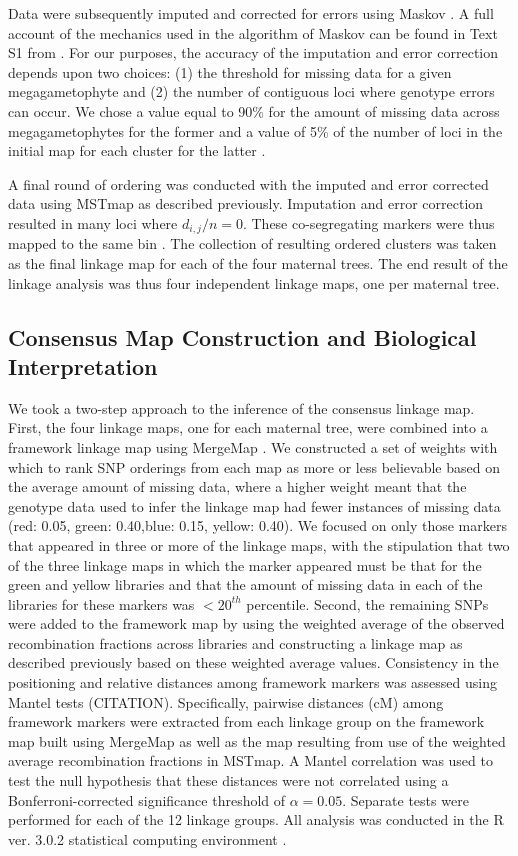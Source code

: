 \documentclass[11pt]{article}
\begin{document}
Data were subsequently imputed and corrected for errors using Maskov \citep{Ward:2013}. A full account of the mechanics used in the algorithm 
of Maskov can be found in Text S1 from \citet{Ward:2013}. For our purposes, the accuracy of the imputation and 
error correction depends upon two choices: (1) the threshold for missing data for a given megagametophyte and (2) the number of 
contiguous loci where genotype errors can occur. We chose a value equal to 90\% for the amount of 
missing data across megagametophytes for the former and a value of 5\% of the number of loci in the initial map for each 
cluster for the latter \citep[cf.][]{Ward:2013}.

A final round of ordering was conducted with the imputed and error corrected data using MSTmap as described previously. Imputation 
and error correction resulted in many loci where $d_{i,j}/n = 0$. These co-segregating markers were thus mapped to the same bin 
\citep[see][]{Wu:2008a}. The collection of resulting ordered clusters was taken as the final linkage map for each of the four maternal trees. 
The end result of the linkage analysis was thus four independent linkage maps, one per maternal tree.

\subsection*{Consensus Map Construction and Biological Interpretation}\label{ss:consensus}
We took a two-step approach to the inference of the consensus linkage map. First, the four linkage maps, one for each maternal tree, were combined
into a framework linkage map using MergeMap \citep{Wu:2008b}.  
We constructed a set of weights with which to rank SNP orderings from each map as more or less believable based on the average 
amount of missing data, where a higher weight meant that the genotype data used to infer the linkage map had fewer instances
of missing data (red: 0.05, green: 0.40,blue: 0.15, yellow: 0.40). We focused on only those markers that appeared in three or more of the linkage maps, 
with the stipulation that two of the three linkage maps in which the marker appeared must be that for the green and yellow libraries and that the
amount of missing data in each of the libraries for these markers was $< 20^{th}$ percentile. Second, the remaining SNPs were added to the framework map by
using the weighted average of the observed recombination fractions across libraries and constructing a linkage map as described previously
based on these weighted average values. Consistency in the positioning and relative distances among framework markers was assessed using
Mantel tests (CITATION). Specifically, pairwise distances (cM) among framework markers were extracted from each linkage group on 
the framework map built using MergeMap as well as the map resulting from use of the weighted average recombination fractions in MSTmap. 
A Mantel correlation was used to test the null hypothesis that  these distances were not correlated using a Bonferroni-corrected significance threshold 
of $\alpha = 0.05$. Separate tests were performed for each of the 12 linkage groups. All analysis was conducted in the R ver. 3.0.2 statistical
computing environment \citep{R:2013}.
\end{document}
